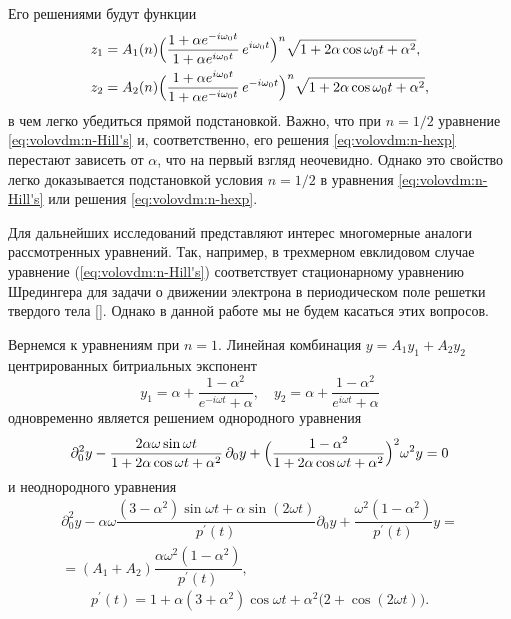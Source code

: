 Его  решениями будут функции
\begin{equation}
\begin{array}{l}
\displaystyle
z_{1}=A_{1} (n) \Bigl(\dfrac{1+\alpha e^{-i\omega_{0}t}}{1+\alpha e^{i\omega_{0}t}}\, e^{i\omega_{0}t}\Bigr)^{n}\sqrt{1+2\alpha\cos\omega_{0}t+\alpha^{2}},\\[3mm]
\displaystyle
z_{2}=A_{2}(n)\Bigl(\dfrac{1+\alpha e^{i\omega_{0}t}}{1+\alpha e^{-i\omega_{0}t}}\, e^{-i\omega_{0}t}\Bigr)^{n}\sqrt{1+2\alpha\cos\omega_{0}t+\alpha^{2}},
\end{array}
\label{eq:volovdm:n-hexp}
\end{equation}
в чем легко убедиться прямой подстановкой. Важно, что при $n={1}/{2}$
уравнение \eqref{eq:volovdm:n-Hill's} и, соответственно, его решения \eqref{eq:volovdm:n-hexp}
перестают зависеть от $\alpha$, что на первый взгляд неочевидно.
Однако это свойство легко доказывается подстановкой условия $n={1}/{2}$
в уравнения \eqref{eq:volovdm:n-Hill's} или решения \eqref{eq:volovdm:n-hexp}.

Для дальнейших исследований представляют интерес многомерные аналоги
рассмотренных уравнений. Так, например, в трехмерном евклидовом случае
уравнение (\ref{eq:volovdm:n-Hill's}) соответствует стационарному уравнению
Шредингера для задачи о движении электрона в периодическом поле решетки
твердого тела {[]}. Однако в данной работе мы не будем
касаться этих вопросов.


\smallskip


Вернемся к уравнениям при $n=1$.
Линейная комбинация $y=A_{1}y_{1}+A_{2}y_{2}$ центрированных битриальных
экспонент 
\[
y_{1}=\alpha+\dfrac{1-\alpha^{2}}{e^{-i\omega t}+\alpha}, \quad  
y_{2}=\alpha+\dfrac{1-\alpha^{2}}{e^{i\omega t}+\alpha}
\]
 одновременно является решением однородного уравнения 
\begin{equation}
\partial_{0}^{2}y-\dfrac{2\alpha\omega\sin\omega t}{1+2\alpha\cos\omega t+\alpha^{2}}\,\partial_{0}y+
\Bigl(\dfrac{1-\alpha^{2}}{1+2\alpha\cos\omega t+\alpha^{2}}\Bigr)^{2}\omega^{2}y=0
\label{eq:volovdm:m-homo-eq}
\end{equation}
и неоднородного уравнения
\begin{multline}
\label{eq:volovdm:3non-homo-noncenter-eq}
\partial_{0}^{2}y-\alpha\omega\dfrac{\left(3-\alpha^{2}\right)\sin\omega t+\alpha\sin (2\omega t) }{ p^{\prime}(t)} \partial_{0}y+\dfrac{\omega^{2}\left(1-\alpha^{2}\right)}{p^{\prime}(t)} y  =\\
=\left(A_{1}+A_{2}\right)\dfrac{\alpha\omega^{2}\left(1-\alpha^{2}\right)}{p^{\prime}(t)},
\end{multline}
\[
p^{\prime}(t)=1+\alpha\left(3+\alpha^{2}\right)\cos\omega t+\alpha^{2}\bigl(2+\cos (2\omega t) \bigr).
\]


